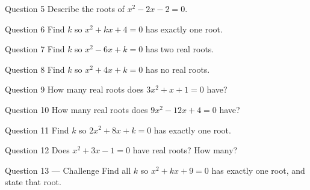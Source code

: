 \documentclass[11pt]{article}
\begin{document}
\begin{qbox}{Question 5}
Describe the roots of $x^2-2x-2=0$.\workspace{2.0cm}
\end{qbox}

\begin{qbox}{Question 6}
Find $k$ so $x^2+kx+4=0$ has exactly one root.\workspace{2.2cm}
\end{qbox}

\begin{qbox}{Question 7}
Find $k$ so $x^2-6x+k=0$ has two real roots.\workspace{2.2cm}
\end{qbox}

\begin{qbox}{Question 8}
Find $k$ so $x^2+4x+k=0$ has no real roots.\workspace{2.2cm}
\end{qbox}

\begin{qbox}{Question 9}
How many real roots does $3x^2+x+1=0$ have?\workspace{2.0cm}
\end{qbox}

\begin{qbox}{Question 10}
How many real roots does $9x^2-12x+4=0$ have?\workspace{2.0cm}
\end{qbox}

\begin{qbox}{Question 11}
Find $k$ so $2x^2+8x+k=0$ has exactly one root.\workspace{2.2cm}
\end{qbox}

\begin{qbox}{Question 12}
Does $x^2+3x-1=0$ have real roots? How many?\workspace{2.0cm}
\end{qbox}

\begin{qbox}{Question 13 --- Challenge}
Find all $k$ so $x^2+kx+9=0$ has exactly one root, and state that root.\workspace{2.8cm}
\end{qbox}

\clearpage
{}
\end{document}
